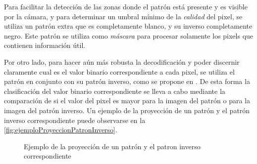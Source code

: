 Para facilitar la detección de las zonas donde el patrón está presente y es visible por la cámara, y para determinar un umbral mínimo de la \emph{calidad} del pixel, se utiliza un patrón extra que es completamente blanco, y su inverso completamente negro. Este patrón se utiliza como \emph{máscara} para procesar solamente los pixels que contienen información útil.

Por otro lado, para hacer aún más robusta la decodificación y poder discernir claramente cual es el valor binario correspondiente a cada pixel, se utiliza el patrón en conjunto con su patrón inverso, como se propone en \cite{trobina1995error}. De esta forma la clasificación del valor binario correspondiente se lleva a cabo mediante la comparación de si el valor del pixel es mayor para la imagen del patrón o para la imagen del patrón inverso. Un ejemplo de la proyección de un patrón y el patrón inverso correspondiente puede observarse en la \autoref{fig:ejemploProyeccionPatronInverso}.

\begin{figure}[!bth]
    \myfloatalign
        \caption{Ejemplo de la proyección de un patrón y el patron inverso correspondiente}
        \label{fig:ejemploProyeccionPatronInverso}
\end{figure}

